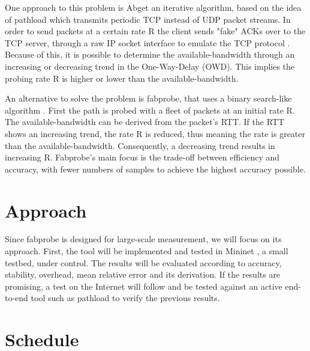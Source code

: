 \documentclass[NET,a4,12pt,english]{netforms}
\begin{document}
One approach to this problem is Abget an iterative algorithm, based on the idea of pathload which transmits periodic TCP instead of UDP packet streams. In order to send packets at a certain rate R the client sends "fake" ACKs over to the TCP server, through a raw IP socket interface to emulate the TCP protocol \cite{proceedings:passivactivemeas} .
Because of this, it is possible to determine the available-bandwidth through an increasing or decreasing trend in the One-Way-Delay (OWD). This implies the probing rate R is higher or lower than the available-bandwidth.

An alternative to solve the problem is fabprobe, that uses a binary search-like algorithm \cite{fabprobe}. %
First the path is probed with a fleet of packets at an initial rate R. The available-bandwidth can be derived from the packet's RTT. If the RTT shows an increasing trend, the rate R is reduced, thus meaning the rate is greater than the available-bandwidth. Consequently, a decreasing trend results in increasing R. Fabprobe's main focus is the trade-off between efficiency and accuracy, with fewer numbers of samples to achieve the highest accuracy possible.

\section*{Approach}
Since fabprobe is designed for large-scale measurement, we will focus on its approach. First, the tool will be implemented and tested in Mininet \cite{mininet}, a small testbed, under control.
The results will be evaluated according to accuracy, stability, overhead, mean relative error and its derivation. If the results are promising, a test on the Internet will follow and be tested against an active end-to-end tool such as pathload to verify the previous results. 

\section*{Schedule}

\resizebox{\textwidth}{!}{
\begin{ganttchart}[hgrid, vgrid={dotted}, group label font={\bf}, x unit=7mm, bar/.append group/.append style={draw=black}]{1}{20}
\gantttitle[y unit title = 1.7 cm]{December}{4}
\gantttitle[y unit title = 1.7 cm]{January}{4}
\gantttitle[y unit title = 1.7 cm]{February}{4}
\gantttitle[y unit title = 1.7 cm]{March}{4}
\gantttitle[y unit title = 1.7 cm]{April}{4}\\

\ganttbar{Analysis}{1}{4}\\
\ganttbar{Implementation}{3}{14}\\
\ganttbar{Testbed setup}{7}{16}\\
\ganttbar{Testing and Validation}{8}{16}\\
\ganttbar{Thesis writing}{9}{18}]
\end{ganttchart}
} %



\end{document}
